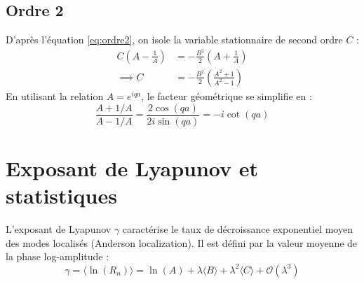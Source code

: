 \subsection{Ordre 2}
D'après l'équation \eqref{eq:ordre2}, on isole la variable stationnaire de second ordre $C$ :
\begin{align}
    C \left( A - \frac{1}{A} \right) &= -\frac{B^2}{2}\left(A + \frac{1}{A}\right) \nonumber \\
    \implies C &= -\frac{B^2}{2} \left( \frac{A^2 + 1}{A^2 - 1} \right)
\end{align}
En utilisant la relation $A = e^{iqa}$, le facteur géométrique se simplifie en :
\begin{equation}
    \frac{A + 1/A}{A - 1/A} = \frac{2\cos(qa)}{2i\sin(qa)} = -i\cot(qa)
\end{equation}

\section{Exposant de Lyapunov et statistiques}

L'exposant de Lyapunov $\gamma$ caractérise le taux de décroissance exponentiel moyen des modes localisés (Anderson localization). Il est défini par la valeur moyenne de la phase log-amplitude :
\begin{equation}
    \gamma = \langle \ln(R_n) \rangle = \ln(A) + \lambda \langle B \rangle + \lambda^2 \langle C \rangle + \mathcal{O}(\lambda^3)
\end{equation}

